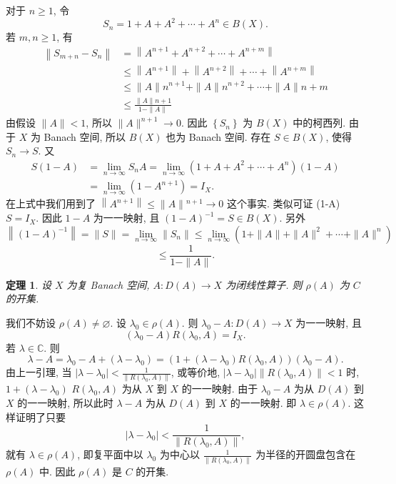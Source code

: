 \documentclass[openany]{ctexbook}
\makeatletter
\theoremstyle{kaiti}
\newtheorem{theorem}{定理}[section]
\theoremstyle{normal}
\renewenvironment{proof}[1][\proofname]{\par
    \pushQED{\qed}%
    \normalfont \topsep6\p@\@plus6\p@\relax
    \trivlist
    \item\relax
    {\heiti #1}\hspace{2\labelsep}\ignorespaces
  }{%
    \popQED\endtrivlist\@endpefalse
  }
\makeatother
\begin{document}
\begin{proof}
对于 $n \geqslant 1$, 令
$$
S_n=1+A+A^2+\cdots+A^n \in B(X).
$$
若 $m, n \geqslant 1$, 有
$$
\begin{aligned}
\left\|S_{m+n}-S_n\right\| &=\left\|A^{n+1}+A^{n+2}+\cdots+A^{n+m}\right\| \\
& \leqslant\left\|A^{n+1}\right\|+\left\|A^{n+2}\right\|+\cdots+\left\|A^{n+m}\right\| \\
& \leqslant\|A\| n^{n+1}+\|A\| n^{n+2}+\cdots+\|A\| n+m \\
& \leqslant \frac{\|A\| n+1}{1-\|A\|}
\end{aligned}
$$
由假设 $\|A\|<1$, 所以 $\|A\|^{n+1} \rightarrow 0$. 因此 $\left\{S_n\right\}$ 为 $B(X)$ 中的柯西列. 由于 $X$ 为 Banach 空间, 所以 $B(X)$ 也为 Banach 空间. 存在 $S \in B(X)$, 使得 $S_n \rightarrow S$. 又
$$
\begin{aligned}
S(1-A) &=\lim_{n \rightarrow \infty} S_n A=\lim_{n \rightarrow \infty}\left(1+A+A^2+\cdots+A^n\right)(1-A) \\
&=\lim_{n \rightarrow \infty}\left(1-A^{n+1}\right)=I_{X}.
\end{aligned}
$$
在上式中我们用到了 $\left\|A^{n+1}\right\| \leqslant\|A\|{ }^{n+1} \rightarrow 0$ 这个事实. 类似可证 (1-A) $S=I_{X}$. 因此 $1-A$ 为一一映射, 且 $(1-A)^{-1}=S \in B(X)$. 另外
$$
\left\|(1-A)^{-1}\right\|=\|S\|=\lim_{n \rightarrow \infty}\left\|S_n\right\| \leqslant \lim_{n \rightarrow \infty}\left(1+\|A\|+\|A\|^2+\cdots+\|A\|^n\right)
$$
$$
\leqslant \frac{1}{1-\|A\|}.
$$
\end{proof}

\begin{theorem}
设 $X$ 为复 Banach 空间, $A: D(A) \rightarrow X$ 为闭线性算子. 则 $\rho(A)$ 为 $C$ 的开集.
\end{theorem}

\begin{proof}
我们不妨设 $\rho(A) \neq \varnothing$. 设 $\lambda_0 \in \rho(A)$. 则 $\lambda_0-A: D(A) \rightarrow X$ 为一一映射, 且
$$
\left(\lambda_0-A\right) R\left(\lambda_0, A\right)=I_{X}.
$$
若 $\lambda \in \mathbb{C}$. 则
\begin{equation}
  \lambda-A=\lambda_0-A+\left(\lambda-\lambda_0\right)=\left(1+\left(\lambda-\lambda_0\right) R\left(\lambda_0, A\right)\right)\left(\lambda_0-A\right).
\end{equation}
由上一引理, 当 $\left|\lambda-\lambda_0\right|<\frac{1}{\left\|R\left(\lambda_0, A\right)\right\|}$, 或等价地, $\left|\lambda-\lambda_0\right|\left\|R\left(\lambda_0, A\right)\right\|<1$ 时, $1+\left(\lambda-\lambda_0\right)$ $R\left(\lambda_0, A\right)$ 为从 $X$ 到 $X$ 的一一映射. 由于 $\lambda_0-A$ 为从 $D(A)$ 到 $X$ 的一一映射, 所以此时 $\lambda-A$ 为从 $D(A)$ 到 $X$ 的一一映射. 即 $\lambda \in \rho(A)$. 这样证明了只要
$$
\left|\lambda-\lambda_0\right|<\frac{1}{\left\|R\left(\lambda_0, A\right)\right\|},
$$
就有 $\lambda \in \rho(A)$, 即复平面中以 $\lambda_0$ 为中心以 $\frac{1}{\left\|R\left(\lambda_0, A\right)\right\|}$ 为半径的开圆盘包含在 $\rho(A)$ 中. 因此 $\rho(A)$ 是 $C$ 的开集.
\end{proof}
\end{document}

